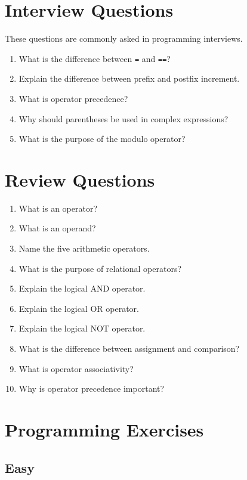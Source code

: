 \documentclass[12pt,openany]{book}
\begin{document}
\section{Interview Questions}

These questions are commonly asked in programming interviews.

\begin{enumerate}
    \item What is the difference between \texttt{=} and \texttt{==}?
    \item Explain the difference between prefix and postfix increment.
    \item What is operator precedence?
    \item Why should parentheses be used in complex expressions?
    \item What is the purpose of the modulo operator?
\end{enumerate}

\section{Review Questions}

\begin{enumerate}
    \item What is an operator?
    \item What is an operand?
    \item Name the five arithmetic operators.
    \item What is the purpose of relational operators?
    \item Explain the logical AND operator.
    \item Explain the logical OR operator.
    \item Explain the logical NOT operator.
    \item What is the difference between assignment and comparison?
    \item What is operator associativity?
    \item Why is operator precedence important?
\end{enumerate}

\section{Programming Exercises}

\subsection*{Easy}
\end{document}
